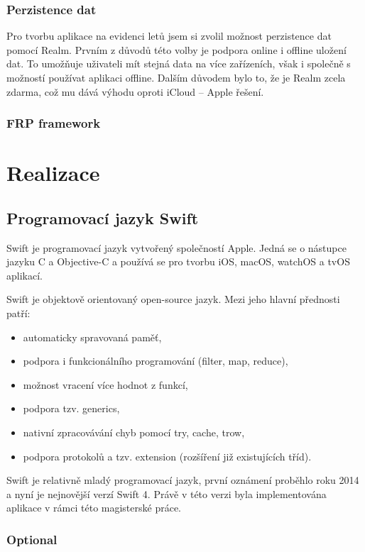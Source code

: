\documentclass[thesis=M,czech]{FITthesis}[2012/06/26]
\begin{document}
\subsection{Perzistence dat}
Pro tvorbu aplikace na evidenci letů jsem si zvolil možnost perzistence dat pomocí Realm. Prvním z důvodů této volby je podpora online i offline uložení dat. To umožňuje uživateli mít stejná data na více zařízeních, však i společně s možností používat aplikaci offline. Dalším důvodem bylo to, že je Realm zcela zdarma, což mu dává výhodu oproti iCloud -- Apple řešení.

\subsection{FRP framework}


\chapter{Realizace}
\label{chap:realizace}

\section{Programovací jazyk Swift}
Swift je programovací jazyk vytvořený společností Apple. Jedná se o nástupce jazyku C a Objective-C a používá se pro tvorbu iOS, macOS, watchOS a tvOS aplikací.

Swift je objektově orientovaný open-source jazyk. Mezi jeho hlavní přednosti patří: 
\begin{itemize}
\item automaticky spravovaná paměť,
\item podpora i funkcionálního programování (filter, map, reduce),
\item možnost vracení  více  hodnot z funkcí,
\item podpora tzv. generics,
\item nativní zpracovávání chyb pomocí try, cache, trow,
\item podpora protokolů a tzv. extension (rozšíření již existujících tříd). \cite{swift}
\end{itemize}

Swift je relativně mladý programovací jazyk, první oznámení proběhlo roku 2014 a nyní je nejnovější verzí Swift 4. Právě v této verzi byla implementována aplikace v rámci této magisterské práce.\cite{swift2}

	\subsection{Optional}
\end{document}
